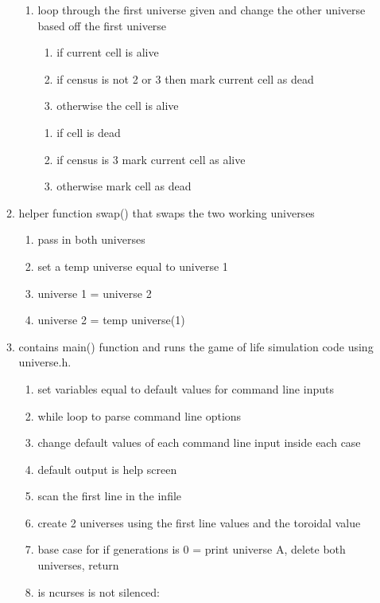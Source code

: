 \documentclass[11pt]{article}
\begin{document}
\begin{enumerate}
\begin{enumerate}
			\begin{enumerate}
			\item loop through the first universe given and change the other universe based off the first universe 
				\begin{enumerate}
				\item if current cell is alive
				\item if census is not 2 or 3 then mark current cell as dead
				\item otherwise the cell is alive
				\end{enumerate}
				\begin{enumerate}
				\item if cell is dead
				\item if census is 3 mark current cell as alive
				\item otherwise mark cell as dead
				\end{enumerate}
			\end{enumerate}
		\item helper function swap() that swaps the two working universes
			\begin{enumerate}
			\item pass in both universes
			\item set a temp universe equal to universe 1
			\item universe 1 = universe 2
			\item universe 2 = temp universe(1)
			\end{enumerate}
		\item contains main() function and runs the game of life simulation code using universe.h.
			\begin{enumerate}
			\item set variables equal to default values for command line inputs
			\item while loop to parse command line options
			\item change default values of each command line input inside each case
			\item default output is help screen
			\item scan the first line in the infile
			\item create 2 universes using the first line values and the toroidal value
			\item base case for if generations is 0 = print universe A, delete both universes, return
			\item is ncurses is not silenced:
				\begin{enumerate}

\end{enumerate}
\end{enumerate}
\end{enumerate}
\end{enumerate}
\end{document}
